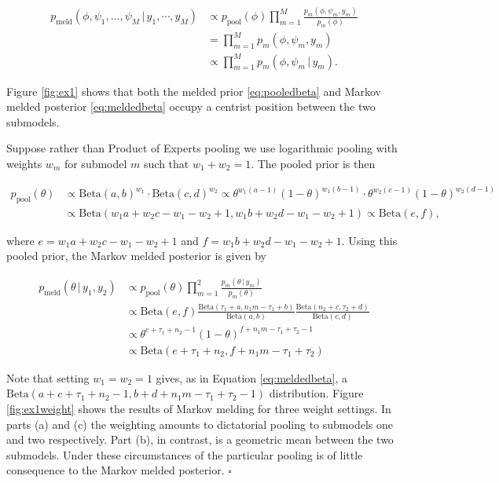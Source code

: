 \documentclass[11pt,]{book}
\begin{document}
\begin{align}
p_{\text{meld}}(\phi, \psi_1, \ldots, \psi_M \, | \, y_1, \cdots, y_M) 
&\propto p_{\text{pool}}(\phi) \prod_{m=1}^{M} \frac{p_m(\phi, \psi_m, y_m)}{p_m(\phi)} \nonumber \\
&= \prod_{m=1}^{M} p_m(\phi, \psi_m, y_m) \nonumber \\
&\propto \prod_{m=1}^{M} p_m(\phi, \psi_m \, | \, y_m). \label{eq:poecancel}
\end{align}

Figure \ref{fig:ex1} shows that both the melded prior
\eqref{eq:pooledbeta} and Markov melded posterior \eqref{eq:meldedbeta}
occupy a centrist position between the two submodels.

Suppose rather than Product of Experts pooling we use logarithmic
pooling with weights \(w_m\) for submodel \(m\) such that
\(w_1 + w_2 = 1\). The pooled prior is then

\begin{align}
p_\text{pool}(\theta) &\propto \text{Beta}(a, b)^{w_1} \cdot \text{Beta}(c, d)^{w_2}
                      \propto \theta^{w_1(a-1)}(1 - \theta)^{w_1(b-1)} \cdot \theta^{w_2(c-1)}(1 - \theta)^{w_2(d-1)} \nonumber \\
                      &\propto \text{Beta}(w_1a + w_2c - w_1 - w_2 + 1, w_1b + w_2d - w_1 - w_2 + 1)
                      \propto \text{Beta}(e, f),
\end{align}

where \(e = w_1a + w_2c - w_1 - w_2 + 1\) and
\(f = w_1b + w_2d - w_1 - w_2 + 1\). Using this pooled prior, the Markov
melded posterior is given by

\begin{align}
p_{\text{meld}}(\theta \, | \, y_1, y_2)
&\propto p_{\text{pool}}(\theta) \prod_{m=1}^{2} \frac{p_m(\theta \, | \, y_m)}{p_m(\theta)} \nonumber \\
&\propto \text{Beta}(e, f) 
\frac{\text{Beta}(\tau_1 + a, n_1m-\tau_1 + b)}{\text{Beta}(a, b)} \frac{\text{Beta}(n_2 + c, \tau_2 + d)}{\text{Beta}(c, d)} \nonumber \\
&\propto \theta^{e + \tau_1 + n_2 - 1}
         (1 - \theta)^{f + n_1m - \tau_1 + \tau_2 - 1} \nonumber \\
&\propto \text{Beta}(e + \tau_1 + n_2, f + n_1m - \tau_1 + \tau_2)
\end{align}

Note that setting \(w_1 = w_2 = 1\) gives, as in Equation
\eqref{eq:meldedbeta}, a
\(\text{Beta}(a + c + \tau_1 + n_2 - 1, b + d + n_1m - \tau_1 + \tau_2 - 1)\)
distribution. Figure \ref{fig:ex1weight} shows the results of Markov
melding for three weight settings. In parts (a) and (c) the weighting
amounts to dictatorial pooling to submodels one and two respectively.
Part (b), in contrast, is a geometric mean between the two submodels.
Under these circumstances of the particular pooling is of little
consequence to the Markov melded posterior. \hfill \(\square\)
\end{document}
